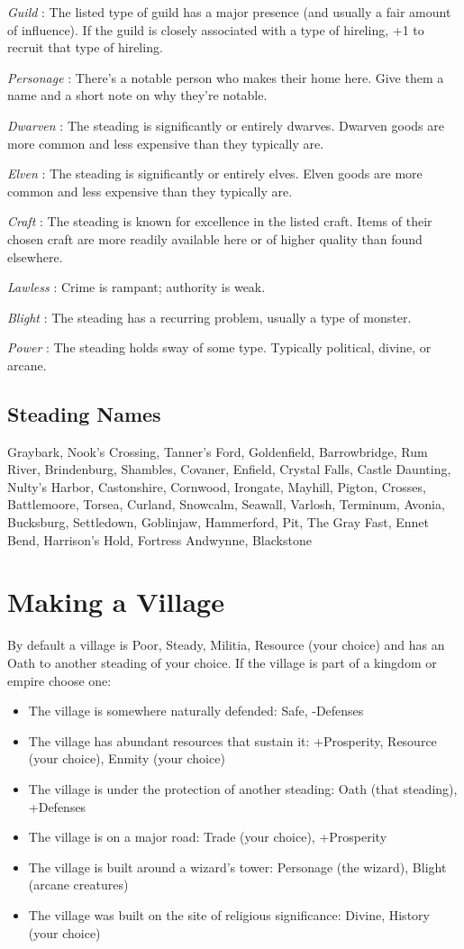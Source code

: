  \emph{Guild}
: The listed type of guild has a major presence (and usually a fair amount of influence). If the guild is closely associated with a type of hireling, +1 to recruit that type of hireling.


 \emph{Personage}
: There's a notable person who makes their home here. Give them a name and a short note on why they're notable.


 \emph{Dwarven}
: The steading is significantly or entirely dwarves. Dwarven goods are more common and less expensive than they typically are.


 \emph{Elven}
: The steading is significantly or entirely elves. Elven goods are more common and less expensive than they typically are.


 \emph{Craft}
: The steading is known for excellence in the listed craft. Items of their chosen craft are more readily available here or of higher quality than found elsewhere. 


 \emph{Lawless}
: Crime is rampant; authority is weak.


 \emph{Blight}
: The steading has a recurring problem, usually a type of monster.


 \emph{Power}
: The steading holds sway of some type. Typically political, divine, or arcane.
\subsection{Steading Names}


 Graybark, Nook's Crossing, Tanner's Ford, Goldenfield, Barrowbridge, Rum River, Brindenburg, Shambles, Covaner, Enfield, Crystal Falls, Castle Daunting, Nulty's Harbor, Castonshire, Cornwood, Irongate, Mayhill, Pigton, Crosses, Battlemoore, Torsea, Curland, Snowcalm, Seawall, Varlosh, Terminum, Avonia, Bucksburg, Settledown, Goblinjaw, Hammerford, Pit, The Gray Fast, Ennet Bend, Harrison's Hold, Fortress Andwynne, Blackstone
\section*{Making a Village}


 By default a village is Poor, Steady, Militia, Resource (your choice) and has an Oath to another steading of your choice. If the village is part of a kingdom or empire choose one:
\begin{itemize}
\item The village is somewhere naturally defended: Safe, -Defenses
\item The village has abundant resources that sustain it: +Prosperity, Resource (your choice), Enmity (your choice)
\item The village is under the protection of another steading: Oath (that steading), +Defenses
\item The village is on a major road: Trade (your choice), +Prosperity
\item The village is built around a wizard's tower: Personage (the wizard), Blight (arcane creatures)
\item The village was built on the site of religious significance: Divine, History (your choice)

\end{itemize}


